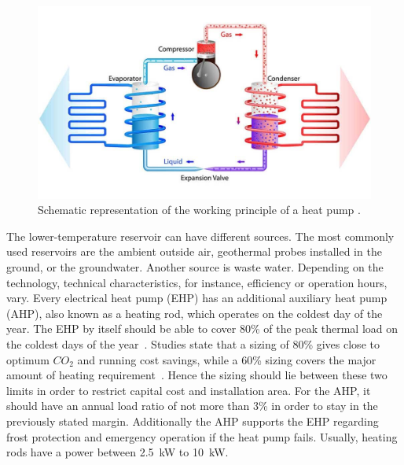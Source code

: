 \begin{figure}[ht]
    \centering
    \includegraphics[scale=0.3]{thesis-latex/img/hpschema.jpg}
    \caption{Schematic representation of the working principle of a heat pump \cite{}.%
    }
    \label{fig:hpschema}
\end{figure}

The lower-temperature reservoir can have different sources. The most commonly used reservoirs are the ambient outside air, geothermal probes installed in the ground, or the groundwater. Another source is waste water. Depending on the technology, technical characteristics, for instance, efficiency or operation hours, vary. Every electrical heat pump (EHP) has an additional auxiliary heat pump (AHP), also known as a heating rod, which operates on the coldest day of the year. The EHP by itself should be able to cover 80\% of the peak thermal load on the coldest days of the year~\cite{navarro-espinosa_probabilistic_2014}. Studies state that a sizing of 80\% gives close to optimum $CO_2$ and running cost savings, while a 60\% sizing covers the major amount of heating requirement~\cite{navarro-espinosa_probabilistic_2014}. Hence the sizing should lie between these two limits in order to restrict capital cost and installation area. For the AHP, it should have an annual load ratio of not more than 3\% in order to stay in the previously stated margin. %
Additionally the AHP supports the EHP regarding frost protection and emergency operation if the heat pump fails. Usually, heating rods have a power between 2.5~kW to 10~kW.%



